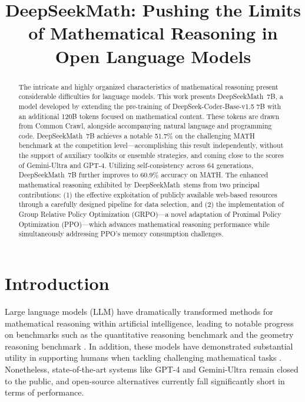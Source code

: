 \title{DeepSeekMath: Pushing the Limits of Mathematical Reasoning in Open Language Models}

\begin{abstract}
The intricate and highly organized characteristics of mathematical reasoning present considerable difficulties for language models. This work presents DeepSeekMath~7B, a model developed by extending the pre-training of DeepSeek-Coder-Base-v1.5 7B with an additional 120B tokens focused on mathematical content. These tokens are drawn from Common Crawl, alongside accompanying natural language and programming code. DeepSeekMath~7B achieves a notable 51.7\% on the challenging MATH benchmark at the competition level—accomplishing this result independently, without the support of auxiliary toolkits or ensemble strategies, and coming close to the scores of Gemini-Ultra and GPT-4. Utilizing self-consistency across 64 generations, DeepSeekMath~7B further improves to 60.9\% accuracy on MATH. The enhanced mathematical reasoning exhibited by DeepSeekMath~stems from two principal contributions: (1) the effective exploitation of publicly available web-based resources through a carefully designed pipeline for data selection, and (2) the implementation of Group Relative Policy Optimization (GRPO)—a novel adaptation of Proximal Policy Optimization (PPO)—which advances mathematical reasoning performance while simultaneously addressing PPO's memory consumption challenges.
\end{abstract}

\section{Introduction}

Large language models (LLM) have dramatically transformed methods for mathematical reasoning within artificial intelligence, leading to notable progress on benchmarks such as the quantitative reasoning benchmark \citep{MATH} and the geometry reasoning benchmark \citep{trinh2024solving}. In addition, these models have demonstrated substantial utility in supporting humans when tackling challenging mathematical tasks \citep{tao}. Nonetheless, state-of-the-art systems like GPT-4 \citep{gpt4} and Gemini-Ultra \citep{gemini} remain closed to the public, and open-source alternatives currently fall significantly short in terms of performance.


